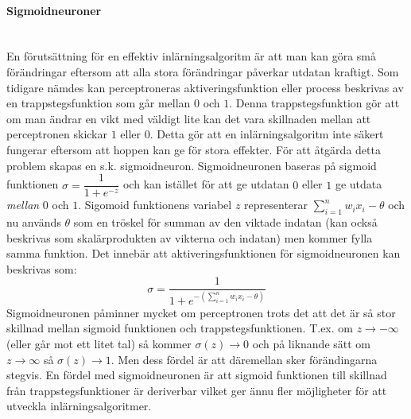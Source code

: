 \documentclass[a4paper,10pt]{article}
\begin{document}
\paragraph{Sigmoidneuroner}\hspace{0pt}\\
En förutsättning för en effektiv inlärningsalgoritm är att man kan göra små förändringar eftersom att alla stora förändringar påverkar utdatan kraftigt. Som tidigare nämdes kan perceptroneras aktiveringsfunktion eller process beskrivas av en trappstegsfunktion som går mellan $0$ och $1$. Denna trappstegsfunktion gör att om man ändrar en vikt med väldigt lite kan det vara skillnaden mellan att \\perceptronen skickar $1$ eller $0$. \autocite{NNDL}Detta gör att en inlärningsalgoritm inte säkert fungerar eftersom att hoppen kan ge för stora effekter. För att åtgärda detta problem skapas en s.k. sigmoidneuron. Sigmoidneuronen baseras på sigmoid funktionen $\sigma=\dfrac{1}{1+e^{-z}}$ och kan istället för att ge utdatan $0$ eller $1$ ge utdata \emph{mellan} $0$ och $1$. Sigomoid funktionens variabel $z$ representerar $\sum_{i=1}^{n} {w_ix_i} -\theta$ och nu används $\theta$ som en tröskel för summan av den viktade indatan (kan också beskrivas som skalärprodukten av vikterna och indatan) men kommer fylla samma funktion. Det innebär att aktiveringsfunktionen för sigmoidneuronen kan beskrivas som:
\[\sigma=\dfrac{1}{1+e^{-(\sum_{i=1}^{n} {w_ix_i} -\theta)}}\]
Sigmoidneuronen påminner mycket om perceptronen trots det att det är så stor skillnad mellan sigmoid funktionen och trappstegsfunktionen. T.ex. om $z\to -\infty$ (eller går mot ett litet tal) så kommer $\sigma(z)\to 0$ och på liknande sätt om $z\to \infty$ så $\sigma(z)\to 1$. Men dess fördel är att däremellan sker förändingarna stegvis.
En fördel med sigmoidneuronen är att sigmoid funktionen till skillnad från trappstegsfunktioner är deriverbar vilket ger ännu fler möjligheter för att utveckla inlärningsalgoritmer.
\end{document}
